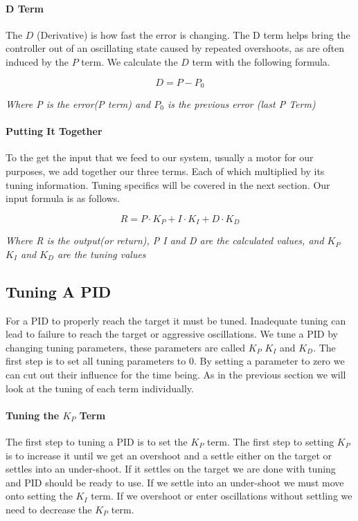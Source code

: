 \documentclass[12pt]{report}
\begin{document}
\paragraph{D Term}
    The $D$ (Derivative) is how fast the error is changing.
    The D term helps bring the controller out of an oscillating state caused by repeated overshoots, 
        as are often induced by the $P$ term. We calculate the $D$ term with the following formula.

    $$D = P - P_0$$
    \begin{center}\em{Where P is the error(P term) and $P_0$ is the previous error (last P Term)}\end{center}

\paragraph{Putting It Together}
    To the get the input that we feed to our system,
        usually a motor for our purposes, we add together our three terms.
    Each of which multiplied by its tuning information.
    Tuning specifics will be covered in the next section. 
    Our input formula is as follows.

    $$ R = P \cdot K_P + I \cdot K_I + D \cdot K_D$$
    \begin{center}
        \em{Where R is the output(or return), 
            P I and D are the calculated values, 
            and $K_P$ $K_I$ and $K_D$ are the tuning values
        }
    \end{center}

\subsection{Tuning A PID}
    For a PID to properly reach the target it must be tuned.
    Inadequate tuning can lead to failure to reach the target or aggressive oscillations.
    We tune a PID by changing tuning parameters, these parameters are called $K_P$ $K_I$ and $K_D$. 
    The first step is to set all tuning parameters to 0.
    By setting a parameter to zero we can cut out their influence for the time being. 
    As in the previous section we will look at the tuning of each term individually.

\paragraph{Tuning the $K_P$ Term}
    The first step to tuning a PID is to set the $K_P$ term.
    The first step to setting $K_P$ is to increase it until we get an overshoot and a settle either on the target or settles into an under-shoot. 
    If it settles on the target we are done with tuning and PID should be ready to use.
    If we settle into an under-shoot we must move onto setting the $K_I$ term.
    If we overshoot or enter oscillations without settling we need to decrease the $K_P$ term.
\end{document}
